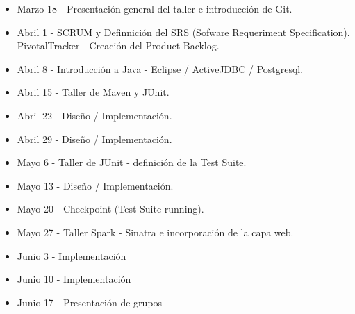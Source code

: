 \begin{itemize}
 \item Marzo 18 - Presentación general del taller e introducción de Git.
\item Abril 1 - SCRUM y Definnición del SRS (Sofware Requeriment Specification). PivotalTracker - Creación del Product Backlog.
\item Abril 8 - Introducción a Java - Eclipse / ActiveJDBC / Postgresql.
\item Abril 15 - Taller de  Maven y JUnit.
\item Abril 22 - Diseño / Implementación.
\item Abril 29 - Diseño / Implementación.
\item Mayo 6 - Taller de JUnit - definición de la Test Suite.
\item Mayo 13 - Diseño / Implementación.
\item Mayo 20 - Checkpoint (Test Suite running).
\item Mayo 27 - Taller Spark - Sinatra e incorporación de la capa web.
\item Junio 3 - Implementación 
\item Junio 10 - Implementación
\item Junio 17 - Presentación de grupos
\end{itemize}

